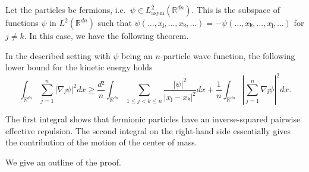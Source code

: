 Let the particles be fermions, i.e.\ $ψ ∈ L_\text{asym}^2(ℝ^{dn})$. This is the subspace of functions $ψ$ in $L^2(ℝ^{dn})$ such that $ψ(…, xⱼ, …, xₖ, …) = - ψ(…, xₖ, …, xⱼ, …)$ for $j \ne k$. In this case, we have the following theorem. \cite{hoholt,methmmp}

\begin{theorem}\label{thm:hardy fermion}
  In the described setting with $ψ$ being an $n$-particle wave function, the following lower bound for the kinetic energy holds
  \begin{equation}\label{eq:fermion ineq}
    ∫_{ℝ^{dn}} ∑_{j=1}^n |∇ⱼψ|^2 dx \ge
    \frac{d²}{n} ∫_{ℝ^{dn}} ∑_{1≤j<k≤n} \frac{|ψ|^2}{|xⱼ-xₖ|^2} dx +
    \frac{1}{n} ∫_{ℝ^{dn}} \left|∑_{j=1}^n ∇ⱼ ψ \right|^2 dx.
  \end{equation}
\end{theorem}

The first integral shows that fermionic particles have an inverse-squared pairwise effective repulsion. The second integral on the right-hand side essentially gives the contribution of the motion of the center of mass.

We give an outline of the proof.

